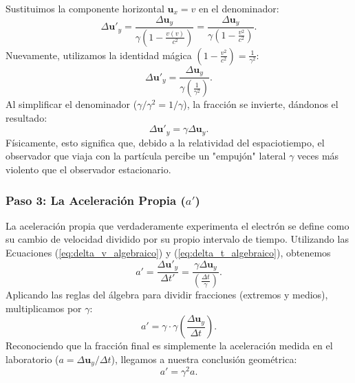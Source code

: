 \documentclass[11pt,a4paper]{book}
\begin{document}
Sustituimos la componente horizontal $\boldsymbol{u}_x = v$ en el denominador:
\begin{equation}
    \Delta \boldsymbol{u}'_y = \frac{\Delta \boldsymbol{u}_y}{\gamma \left( 1 - \frac{v(v)}{c^2} \right)} = \frac{\Delta \boldsymbol{u}_y}{\gamma \left( 1 - \frac{v^2}{c^2} \right)}.
\end{equation}
Nuevamente, utilizamos la identidad mágica $\left(1 - \frac{v^2}{c^2}\right) = \frac{1}{\gamma^2}$:
\begin{equation}
    \Delta \boldsymbol{u}'_y = \frac{\Delta \boldsymbol{u}_y}{\gamma \left( \frac{1}{\gamma^2} \right)}.
\end{equation}
Al simplificar el denominador ($\gamma / \gamma^2 = 1/\gamma$), la fracción se invierte, dándonos el resultado:
\begin{equation}
    \Delta \boldsymbol{u}'_y = \gamma \Delta \boldsymbol{u}_y.
    \label{eq:delta_v_algebraico}
\end{equation}
Físicamente, esto significa que, debido a la relatividad del espaciotiempo, el observador que viaja con la partícula percibe un "empujón" lateral $\gamma$ veces más violento que el observador estacionario.

\subsubsection{Paso 3: La Aceleración Propia ($a'$)}

La aceleración propia que verdaderamente experimenta el electrón se define como su cambio de velocidad dividido por su propio intervalo de tiempo. Utilizando las Ecuaciones (\ref{eq:delta_v_algebraico}) y (\ref{eq:delta_t_algebraico}), obtenemos
\begin{equation}
    a' = \frac{\Delta \boldsymbol{u}'_y}{\Delta t'} = \frac{\gamma \Delta \boldsymbol{u}_y}{\left( \frac{\Delta t}{\gamma} \right)}.
\end{equation}
Aplicando las reglas del álgebra para dividir fracciones (extremos y medios), multiplicamos por $\gamma$:
\begin{equation}
    a' = \gamma \cdot \gamma \left( \frac{\Delta \boldsymbol{u}_y}{\Delta t} \right).
\end{equation}
Reconociendo que la fracción final es simplemente la aceleración medida en el laboratorio ($a = \Delta \boldsymbol{u}_y / \Delta t$), llegamos a nuestra conclusión geométrica:
\begin{equation}
    a' = \gamma^2 a.
    \label{eq:aceleracion_propia}
\end{equation}
\end{document}
